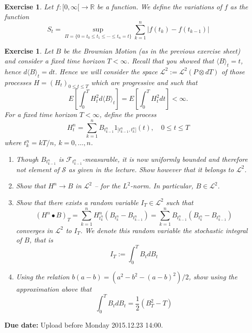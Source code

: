 \documentclass[DIV=classic,a4paper,10pt]{scrartcl}
\newtheorem{exercise}[theorem]{Exercise}
\theoremstyle{nonumberplain}
\numberwithin{equation}{section}
\begin{document}
\begin{exercise}
    Let $f:[0,\infty[\to \mathbb{R}$ be a function.
    We define the variations of $f$ as the function 
    \begin{equation*}
        S_t=\sup_{\Pi=\{0=t_0\leq t_1\leq \cdots \leq t_n=t\}} \sum_{k=1}^n \left|f(t_k)-f(t_{k-1})\right|
    \end{equation*}
\end{exercise}
\begin{exercise}
    Let $B$ be the Brownian Motion (as in the previous exercise sheet) and consider a fixed time horizon $T<\infty$.
    Recall that you showed that $\langle B\rangle_t=t$, hence $d\langle B\rangle_t=dt$.
    Hence we will consider the space $\mathcal{L}^2:=\mathcal{L}^2(P\otimes dT)$ of those processes $H=(H_t)_{0\leq t\leq T}$ which are progressive and such that
    \begin{equation*}
        E\left[ \int_{0}^{T}H_t^2 d\langle B\rangle_t  \right]=E\left[ \int_{0}^{T}H_t^2dt  \right]<\infty.
    \end{equation*}
    For a fixed time horizon $T<\infty$, define the process
    \begin{equation*}
        H^n_t=\sum_{k=1}^nB_{t_{k-1}^n}1_{]t_{k-1}^n,t_k^n]}(t), \quad 0\leq t\leq T
    \end{equation*}
    where $t_k^n=kT/n$, $k=0,\ldots, n$.
    \begin{enumerate}[label=\textit{(\roman*)}, fullwidth]
        \item Though $B_{t_{k-1}^n}$ is $\mathcal{F}_{t_{k-1}^n}$-measurable, it is now uniformly bounded and therefore not element of $\mathcal{S}$ as given in the lecture.
            Show however that it belongs to $\mathcal{L}^2$.
        \item Show that $H^n\to B$ in $\mathcal{L}^2$ -- for the $L^2$-norm.
            In particular, $B \in \mathcal{L}^2$.
        \item Show that there exists a random variable $I_T\in \mathcal{L}^2$ such that
            \begin{equation*}
                (H^n\bullet B)_T=\sum_{k=1}^nH^n_{t_k^n}\left( B_{t_k^n}-B_{t_{k-1}^n} \right)=\sum_{k=1}^nB_{t_{k-1}^n}\left( B_{t_{k}^n}-B_{t_{k-1}^n} \right)
            \end{equation*}
            converges in $\mathcal{L}^2$ to $I_T$.
            We denote this random variable the stochastic integral of $B$, that is
            \begin{equation*}
                I_T:=\int_{0}^{T}B_t dB_t 
            \end{equation*}
        \item Using the relation $b(a-b)=(a^2-b^2-(a-b)^2)/2$, show using the approximation above that
            \begin{equation*}
                \int_{0}^{T}B_tdB_t=\frac{1}{2}\left(B_T^2-T \right)
            \end{equation*}
    \end{enumerate}
\end{exercise}

\smallskip
\noindent
\textbf{Due date:} Upload before Monday 2015.12.23 14:00.
\end{document}
